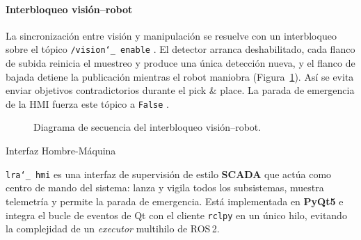 \documentclass[12pt,a4paper]{article}
\makeatletter
\newcommand{\subsecfmt}[1]{%
  {\large\bfseries\color{MediumBlue}#1}%
  \par\vspace{2pt}%
}
\renewcommand\subsection{%
  \@ifstar\subsection@star\subsection@nostar
}
\newcommand\subsection@nostar[1]{%
  \refstepcounter{subsection}%
  \addcontentsline{toc}{subsection}{\protect\numberline{\thesubsection}#1}%
  \vspace{10pt}%
  \subsecfmt{\thesubsection.\enspace #1}%
  \vspace{2pt}%
}
\newcommand\subsection@star[1]{%
  \vspace{10pt}\subsecfmt{#1}\vspace{2pt}%
}
\newcommand{\code}[1]{%
  \begingroup
  \def\_{\char`_\penalty0 }%
  \def\/{\char`/\penalty0 }%
  \texttt{\small #1}%
  \endgroup}
\makeatother
\begin{document}
\paragraph{Interbloqueo visión--robot}
\label{sec:interlock}

La sincronización entre visión y manipulación se resuelve con un
interbloqueo sobre el tópico \code{/vision\_enable}. El detector arranca deshabilitado, cada flanco de
subida reinicia el muestreo y produce una única detección nueva, y el
flanco de bajada detiene la publicación mientras el robot maniobra
(Figura~\ref{fig:interlock}). Así se evita enviar objetivos contradictorios
durante el pick \& place. La parada de emergencia de la HMI fuerza este
tópico a \code{False}.

\begin{figure}[H]
\centering
{}
\caption{Diagrama de secuencia del interbloqueo visión--robot.}
\label{fig:interlock}
\end{figure}

\clearpage
\subsection{Interfaz Hombre-Máquina}
\label{sec:hmi}

\code{lra\_hmi} es una interfaz de
supervisión de estilo \textbf{SCADA} que actúa como centro de mando del
sistema: lanza y vigila todos los subsistemas, muestra telemetría y permite la
parada de emergencia. Está implementada en \textbf{PyQt5} e integra el bucle de
eventos de Qt con el cliente \code{rclpy} en un único hilo, evitando la
complejidad de un \textit{executor} multihilo de ROS\,2.
\end{document}
